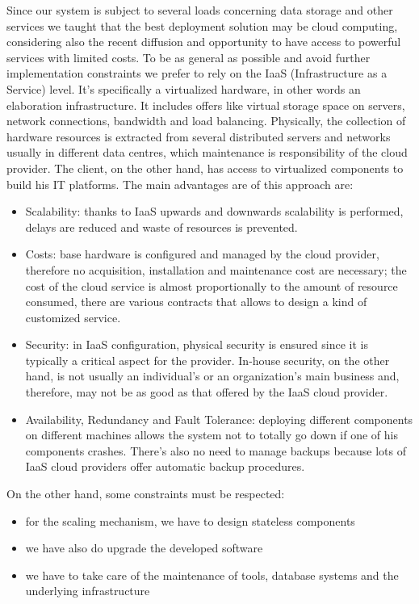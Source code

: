 Since our system is subject to several loads concerning data storage and other services we taught that the best deployment solution may be cloud computing, considering also the recent diffusion and opportunity to have access to powerful services with limited costs. 
To be as general as possible and avoid further implementation constraints we prefer to rely on the
IaaS (Infrastructure as a Service) level. It’s specifically a virtualized hardware, in other words an elaboration infrastructure. It includes offers like virtual storage space on servers, network connections, bandwidth and load balancing. Physically, the collection of hardware resources is extracted from several distributed servers and networks usually in different data centres, which maintenance is responsibility of the cloud provider. 
The client, on the other hand, has access to virtualized components to build his IT platforms.
The main advantages are of this approach are:
\begin{itemize}

\item	Scalability: thanks to IaaS upwards and downwards scalability is performed, delays are reduced and waste of resources is prevented.
\item	Costs: base hardware is configured and managed by the cloud provider, therefore no acquisition, installation and maintenance cost are necessary; the cost of the cloud service is almost proportionally to the amount of resource consumed, there are various contracts that allows to design a kind of customized service.
\item	Security: in IaaS configuration, physical security is ensured since it is typically a critical aspect for the provider. In-house security, on the other hand, is not usually an individual’s or an organization’s main business and, therefore, may not be as good as that offered by the IaaS cloud provider.
\item	Availability, Redundancy and Fault Tolerance: deploying different components on different machines allows the system not to totally go down if one of his components crashes. There’s also no need to manage backups because lots of IaaS cloud providers offer automatic backup procedures.
\end{itemize}

On the other hand, some constraints must be respected:
\begin{itemize}
\item	for the scaling mechanism, we have to design stateless components
\item	we have also do upgrade the developed software
\item	we have to take care of the maintenance of tools, database systems and the underlying infrastructure
\end{itemize}
%
%
